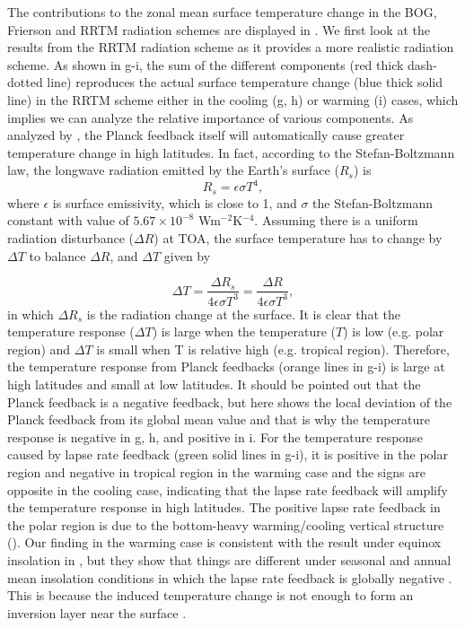 The contributions to the zonal mean surface temperature change in the BOG, Frierson and RRTM radiation schemes are displayed in . We first look at the results from the RRTM radiation scheme as it provides a more realistic radiation scheme. As shown in g-i, the sum of the different components (red thick dash-dotted line) reproduces the actual surface temperature change (blue thick solid line) in the RRTM scheme either in the cooling (g, h) or warming (i) cases, which implies we can analyze the relative importance of various components. As analyzed by \cite{Pithan2014}, the Planck feedback itself will automatically cause greater temperature change in high latitudes. In fact, according to the Stefan-Boltzmann law, the longwave radiation emitted by the Earth's surface ($R_s$) is
\begin{equation}
	R_s = \epsilon\sigma T^4,
\end{equation}
where $\epsilon$ is surface emissivity, which is close to 1, and $\sigma$ the Stefan-Boltzmann constant with value of $5.67\times 10^{-8}$ Wm$^{-2}$K$^{-4}$. Assuming there is a uniform radiation disturbance ($\Delta R$) at TOA, the surface temperature has to change by $\Delta T$ to balance $\Delta R$, and $\Delta T$ given by

\begin{equation}
\Delta T =\frac{\Delta R_s}{4\epsilon\sigma T^3}=\frac{\Delta R}{4\epsilon\sigma T^3},
\end{equation}
in which $\Delta R_s$ is the radiation change at the surface. It is clear that the temperature response ($\Delta T$) is large when the temperature ($T$) is low (e.g. polar region) and $\Delta T$ is small when T is relative high (e.g. tropical region). Therefore, the temperature response from Planck feedbacks (orange lines in g-i) is large at high latitudes and small at low latitudes. It should be pointed out that the Planck feedback is a negative feedback, but here  shows the local deviation of the Planck feedback from its global mean value and that is why the temperature response is negative in g, h, and positive in i. For the temperature response caused by lapse rate feedback (green solid lines in g-i), it is positive in the polar region and negative in tropical region in the warming case and the signs are opposite in the cooling case, indicating that the lapse rate feedback will amplify the temperature response in high latitudes. The positive lapse rate feedback in the polar region is due to the bottom-heavy warming/cooling vertical structure (). Our finding in the warming case is consistent with the result under equinox insolation in \cite{Kim2018}, but they show that things are different under seasonal and annual mean insolation conditions in which the lapse rate feedback is globally negative \citep[see Fig. S1 of][]{Kim2018}. This is because the induced temperature change is not enough to form an inversion layer near the surface \citep{Kim2018}. %

